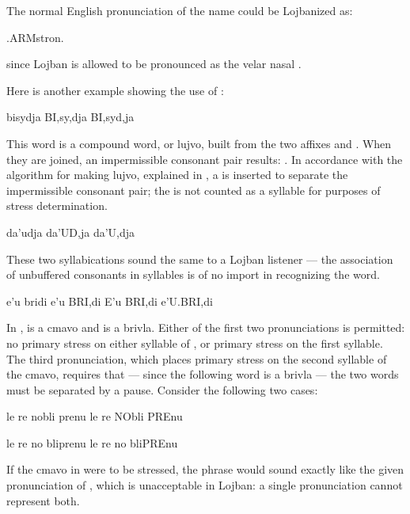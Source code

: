 The normal English pronunciation of the name  could be Lojbanized as:
\begin{example}
.ARMstron.
\end{example}

{\noindent}since Lojban  is allowed to be pronounced as the velar nasal . 

Here is another example showing the use of :
\begin{example}
bisydja\n
BI,sy,dja\n
BI,syd,ja
\end{example}

This word is a compound word, or lujvo, built from the two affixes  and . When they are joined, an impermissible consonant pair results: . In accordance with the algorithm for making lujvo, explained in , a  is inserted to separate the impermissible consonant pair; the  is not counted as a syllable for purposes of stress determination.
\begin{example}
da'udja\n
da'UD,ja\n
da'U,dja
\end{example}

These two syllabications sound the same to a Lojban listener --- the association of unbuffered consonants in syllables is of no import in recognizing the word.
\begin{example}
e'u bridi\n
e'u BRI,di\n
E'u BRI,di\n
e'U.BRI,di
\end{example}

In ,  is a cmavo and  is a brivla. Either of the first two pronunciations is permitted: no primary stress on either syllable of , or primary stress on the first syllable. The third pronunciation, which places primary stress on the second syllable of the cmavo, requires that --- since the following word is a brivla --- the two words must be separated by a pause. Consider the following two cases:
\begin{example}
le re nobli prenu\n
le re NObli PREnu
\end{example}

\begin{example}
le re no bliprenu\n
le re no bliPREnu
\end{example}

If the cmavo  in  were to be stressed, the phrase would sound exactly like the given pronunciation of , which is unacceptable in Lojban: a single pronunciation cannot represent both.



